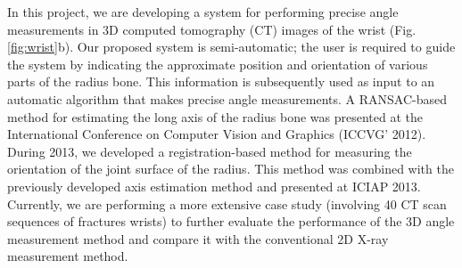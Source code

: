 \begin{enumerate}
{In this project, we are developing a system for performing precise angle measurements in 3D computed tomography (CT) images of the wrist (Fig. \ref{fig:wrist}b). Our proposed system is semi-automatic; the user is required to guide the system by indicating the approximate position and orientation of various parts of the radius bone. This information is subsequently used as input to an automatic algorithm that makes precise angle measurements. A RANSAC-based method for estimating the long axis of the radius bone was presented at the International Conference on Computer Vision and Graphics (ICCVG' 2012). During 2013, we developed a registration-based method for measuring the orientation of the joint surface of the radius. This method was combined with the previously developed axis estimation method and presented at ICIAP 2013. Currently, we are performing a more extensive case study (involving 40 CT scan sequences of fractures wrists) to further evaluate the performance of the 3D angle measurement method and compare it with the conventional 2D X-ray measurement method.}


\end{enumerate}
